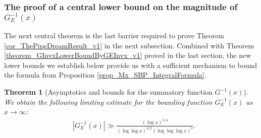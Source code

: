 \documentclass[11pt,reqno,a4letter]{article}
\numberwithin{figure}{section}
\numberwithin{table}{section}
\theoremstyle{plain}
\newtheorem{theorem}{Theorem}
\numberwithin{theorem}{section}
\theoremstyle{definition}
\newcommand{\NBRef}[1]{}
\begin{document}
\subsubsection{The proof of a central lower bound on the magnitude of $G_{E}^{-1}(x)$} 

The next central theorem is the last barrier required to prove 
Theorem \ref{cor_ThePipeDreamResult_v1} 
in the next subsection. 
Combined with Theorem \ref{theorem_GInvxLowerBoundByGEInvx_v1} 
proved in the last section, the new lower bounds we establish below provide us 
with a sufficient mechanism to bound the formula from 
Proposition \ref{prop_Mx_SBP_IntegralFormula}. 

\begin{theorem}[Asymptotics and bounds for the summatory function $G^{-1}(x)$] 
\label{theorem_gInv_GeneralAsymptoticsForms}
We obtain the following limiting estimate for the bounding function 
$G_{E}^{-1}(x)$ as $x \rightarrow \infty$: 
\begin{align*} 
 & \left\lvert G_{E}^{-1}\left(x\right) \right\rvert
     \gg \frac{(\log x)^{5/4}}{(\log\log x)^{3/2} (\log\log\log x)^2}. 
\end{align*} 
\end{theorem} 
\NBRef{A10-2020.04-26} 
\end{document}

